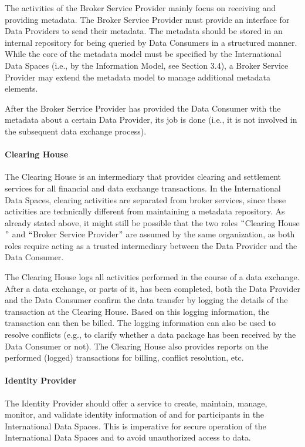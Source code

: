The activities of the Broker Service Provider mainly focus on receiving and providing metadata. The Broker Service Provider must provide an interface for Data Providers to send their metadata. The metadata should be stored in an internal repository for being queried by Data Consumers in a structured manner. While the core of the metadata model must be specified by the International Data Spaces (i.e., by the Information Model, see Section 3.4), a Broker Service Provider may extend the metadata model to manage additional metadata elements.

After the Broker Service Provider has provided the Data Consumer with the metadata about a certain Data Provider, its job is done (i.e., it is not involved in the subsequent data exchange process).


\paragraph{Clearing House}
The Clearing House is an intermediary that provides clearing and settlement services for all financial and data exchange transactions. In the International Data Spaces, clearing activities are separated from broker services, since these activities are technically different from maintaining a metadata repository. As already stated above, it might still be possible that the two roles $``$Clearing House$"$  and $``$Broker Service Provider$"$  are assumed by the same organization, as both roles require acting as a trusted intermediary between the Data Provider and the Data Consumer.

The Clearing House logs all activities performed in the course of a data exchange. After a data exchange, or parts of it, has been completed, both the Data Provider and the Data Consumer confirm the data transfer by logging the details of the transaction at the Clearing House. Based on this logging information, the transaction can then be billed. The logging information can also be used to resolve conflicts (e.g., to clarify whether a data package has been received by the Data Consumer or not). The Clearing House also provides reports on the performed (logged) transactions for billing, conflict resolution, etc.

\paragraph{Identity Provider}
The Identity Provider should offer a service to create, maintain, manage, monitor, and validate identity information of and for participants in the International Data Spaces\textit{. }This is imperative for secure operation of the International Data Spaces and to avoid unauthorized access to data. 

